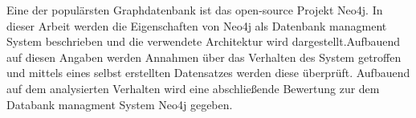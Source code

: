 Eine der populärsten Graphdatenbank ist das open-source Projekt Neo4j\parencite{francis2018cypher}. In dieser Arbeit werden die Eigenschaften von Neo4j als Datenbank managment System beschrieben und die verwendete Architektur wird dargestellt.Aufbauend auf diesen Angaben werden Annahmen über das Verhalten des System getroffen und mittels eines selbst erstellten Datensatzes werden diese überprüft. Aufbauend auf dem analysierten Verhalten wird eine abschließende Bewertung zur dem Databank managment System Neo4j gegeben. 

